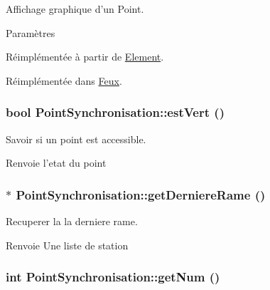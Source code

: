 Affichage graphique d'un Point. 


\begin{DoxyParams}{Paramètres}
\item[{\em }]\end{DoxyParams}


Réimplémentée à partir de \hyperlink{classElement_aabcc968ccfa004f84bddda789441368b}{Element}.



Réimplémentée dans \hyperlink{classFeux_a8bb7f9817c38d79927c9a4b471534889}{Feux}.

\hypertarget{classPointSynchronisation_a230f8d22845e44ea7cd4cb96d9f5128c}{
\subsubsection[{estVert}]{\setlength{\rightskip}{0pt plus 5cm}bool PointSynchronisation::estVert ()}}
\label{classPointSynchronisation_a230f8d22845e44ea7cd4cb96d9f5128c}


Savoir si un point est accessible. 

\begin{DoxyReturn}{Renvoie}
l'etat du point 
\end{DoxyReturn}
\hypertarget{classPointSynchronisation_a6cecce4b7274aabe549c96b2d55b0cda}{
\subsubsection[{getDerniereRame}]{ $\ast$ PointSynchronisation::getDerniereRame ()}}
\label{classPointSynchronisation_a6cecce4b7274aabe549c96b2d55b0cda}


Recuperer la la derniere rame. 

\begin{DoxyReturn}{Renvoie}
Une liste de station 
\end{DoxyReturn}
\hypertarget{classPointSynchronisation_a46838a33d790814c14cf284f48beac7c}{
\subsubsection[{getNum}]{\setlength{\rightskip}{0pt plus 5cm}int PointSynchronisation::getNum ()}}
\label{classPointSynchronisation_a46838a33d790814c14cf284f48beac7c}


